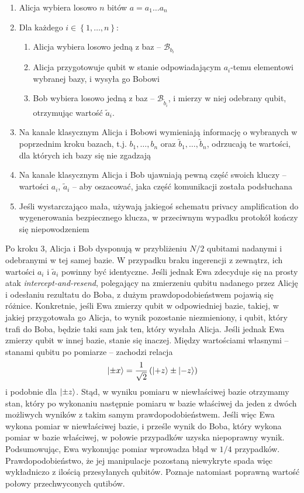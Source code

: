 \documentclass[10pt]{article}
\begin{document}
\begin{enumerate}
  \item Alicja wybiera losowo \(n\) bitów \(a=a_1\ldots a_n\)
  \item Dla każdego \(i\in\left\{1,\ldots,n\right\}\):
    \begin{enumerate}
      \item Alicja wybiera losowo jedną z baz -- \(\mathcal{B}_{b_i}\)
      \item Alicja przygotowuje qubit w stanie odpowiadającym \(a_i\)-temu elementowi wybranej
        bazy, i wysyła go Bobowi
      \item Bob wybiera losowo jedną z baz -- \(\mathcal{B}_{\tilde{b}_i}\), i mierzy w niej
        odebrany qubit, otrzymując wartość \(\tilde{a}_i\).
    \end{enumerate}
  \item Na kanale klasycznym Alicja i Bobowi wymieniają informację o wybranych w poprzednim
    kroku bazach, t.j. \(b_1,\ldots,b_n\) oraz \(\tilde{b}_1,\ldots,\tilde{b}_n\), odrzucają te
    wartości, dla których ich bazy się nie zgadzają
  \item Na kanale klasycznym Alicja i Bob ujawniają pewną część swoich kluczy -- wartości 
    \(a_i\), \(\tilde{a}_i\) -- aby oszacować, jaka część komunikacji została podsłuchana
  \item Jeśli wystarczająco mała, używają jakiegoś schematu privacy amplification do wygenerowania
    bezpiecznego klucza, w przeciwnym wypadku protokół kończy się niepowodzeniem
\end{enumerate}

Po kroku 3, Alicja i Bob dysponują w przybliżeniu \(N/2\) qubitami nadanymi i odebranymi w tej samej
bazie. W przypadku braku ingerencji z zewnątrz, ich wartości \(a_i\) i \(\tilde{a}_i\) powinny być
identyczne. Jeśli jednak Ewa zdecyduje się na prosty atak \emph{intercept-and-resend}, polegający
na zmierzeniu qubitu nadanego przez Alicję i odesłaniu rezultatu do Boba, z dużym prawdopodobieństwem
pojawią się różnice. Konkretnie, jeśli Ewa zmierzy qubit w odpowiedniej bazie, takiej, w jakiej
przygotowała go Alicja, to wynik pozostanie niezmieniony, i qubit, który trafi do Boba, będzie taki
sam jak ten, który wysłała Alicja. Jeśli jednak Ewa zmierzy qubit w innej bazie, stanie się inaczej.
Między wartościami własnymi -- stanami qubitu po pomiarze -- zachodzi relacja
\[
\Ket{\pm x}=\frac{1}{\sqrt{2}}\left(\Ket{+z}\pm\Ket{-z}\right)
\]
i podobnie dla \(\Ket{\pm z}\). Stąd, w wyniku pomiaru w niewłaściwej bazie otrzymamy stan, który
po wykonaniu następnie pomiaru w bazie właściwej da jeden z dwóch możliwych wyników z takim samym
prawdopodobieństwem. Jeśli więc Ewa wykona pomiar w niewłaściwej bazie, i prześle wynik do Boba,
który wykona pomiar w bazie właściwej, w połowie przypadków uzyska niepoprawny wynik. Podsumowując,
Ewa wykonując pomiar wprowadza błąd w \(1/4\) przypadków. Prawdopodobieństwo, że jej manipulacje
pozostaną niewykryte spada więc wykładniczo z ilością przesyłanych qubitów. Poznaje natomiast 
poprawną wartość połowy przechwyconych qutibów. 
\end{document}
